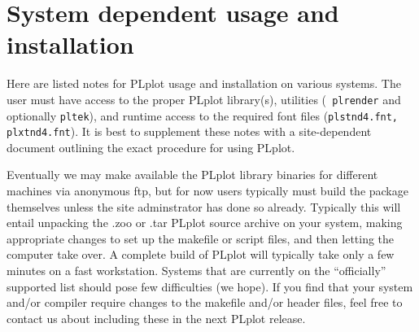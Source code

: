 \chapter{System dependent usage and installation}
\label{ap:sys}

Here are listed notes for PLplot usage and installation on various systems.
The user must have access to the proper PLplot library(s), utilities ({\tt
plrender} and optionally {\tt pltek}), and runtime access to the required
font files ({\tt plstnd4.fnt, plxtnd4.fnt}).  It is best to supplement these
notes with a site-dependent document outlining the exact procedure for using
PLplot.

Eventually we may make available the PLplot library binaries for different
machines via anonymous ftp, but for now users typically must build the
package themselves unless the site adminstrator has done so already.
Typically this will entail unpacking the .zoo or .tar PLplot source archive
on your system, making appropriate changes to set up the makefile or script
files, and then letting the computer take over.  A complete build of PLplot
will typically take only a few minutes on a fast workstation.  Systems
that are currently on the ``officially'' supported list should pose few
difficulties (we hope).  If you find that your system and/or compiler
require changes to the makefile and/or header files, feel free to contact us
about including these in the next PLplot release.








